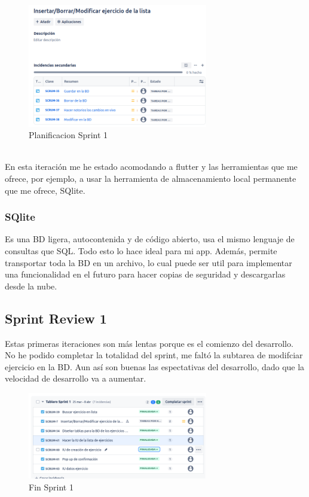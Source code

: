 \begin{figure}[h!]
  \centering
  \includegraphics[width=0.7\textwidth]{fotos/SubListPre1.png}
  \caption{Planificacion Sprint 1}
  \label{fig:imagen}
\end{figure}

\clearpage

\\
En esta iteración me he estado acomodando a flutter y las herramientas que me ofrece, por ejemplo, a usar la herramienta de almacenamiento local permanente que me ofrece, SQlite.

\subsubsection{SQlite}
Es una BD ligera, autocontenida y de código abierto, usa el mismo lenguaje de consultas que SQL. Todo esto lo hace ideal para mi app. Además, permite transportar toda la BD en un archivo, lo cual puede ser util para implementar una funcionalidad en el futuro para hacer copias de seguridad y descargarlas desde la nube.

\subsection{Sprint Review 1}
Estas primeras iteraciones son más lentas porque es el comienzo del desarrollo. No he podido completar la totalidad del sprint, me faltó la subtarea de modifciar ejercicio en la BD. Aun así son buenas las espectativas del desarrollo, dado que la velocidad de desarrollo va a aumentar.

\begin{figure}[h!]
  \centering
  \includegraphics[width=0.7\textwidth]{fotos/PostSprint1.png}
  \caption{Fin Sprint 1}
  \label{fig:imagen}
\end{figure}

